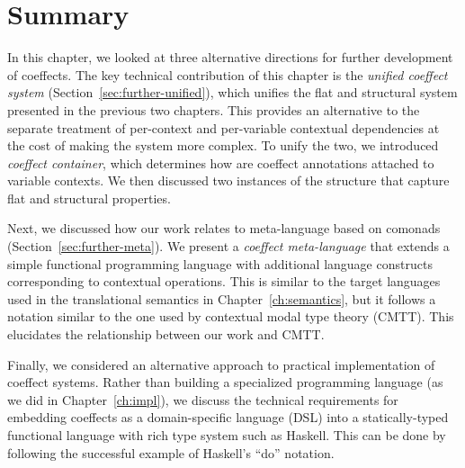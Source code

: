 %
%

\section{Summary}

In this chapter, we looked at three alternative directions for further development of coeffects.
The key technical contribution of this chapter is the \emph{unified coeffect system}
(Section~\ref{sec:further-unified}), which unifies the flat and structural system presented
in the previous two chapters. This provides an alternative to the separate treatment of
per-context and per-variable contextual dependencies at the cost of making the system more
complex. To unify the two, we introduced \emph{coeffect container}, which determines how are
coeffect annotations attached to variable contexts. We then discussed two
instances of the structure that capture flat and structural properties.

Next, we discussed how our work relates to meta-language based on comonads (Section~\ref{sec:further-meta}).
We present a \emph{coeffect meta-language} that extends a simple functional programming language
with additional language constructs corresponding to contextual operations. This is similar to the
target languages used in the translational semantics in Chapter~\ref{ch:semantics}, but it follows
a notation similar to the one used by contextual modal type theory (CMTT). This elucidates the
relationship between our work and CMTT.

Finally, we considered an alternative approach to practical implementation of coeffect systems.
Rather than building a specialized programming language (as we did in Chapter~\ref{ch:impl}), we
discuss the technical requirements for embedding coeffects as a domain-specific language (DSL) into
a statically-typed functional language with rich type system such as Haskell. This can be done by
following the successful example of Haskell's ``do'' notation.
